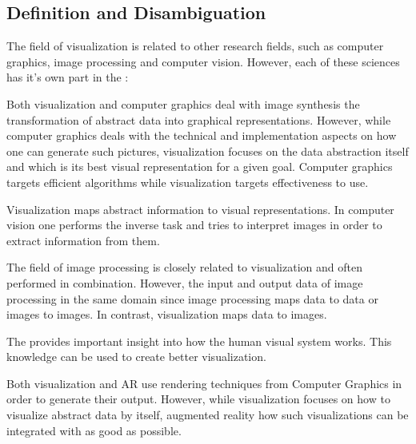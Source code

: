 \subsection{Definition and Disambiguation}
\label{sec:background:vis:definition}
The field of visualization is  related to other research fields, such as computer graphics, image processing and computer vision.
However, each of these sciences has it's own part in the  \CN:
\begin{my_list_desc}
	\item[Computer Graphics]
		Both visualization and computer graphics deal with image synthesis the transformation of abstract data into graphical representations.
		However, while computer graphics deals with the technical and implementation aspects on how one can generate such pictures, visualization focuses on the data abstraction itself and which is its best visual representation for a given goal.
		Computer graphics targets efficient algorithms while visualization targets effectiveness to use.
	
	\item[Computer Vision]
		Visualization maps abstract information to visual representations.
		In computer vision one performs the inverse task and tries to interpret images in order to extract information from them.
	
	\item[Image Processing]
		The field of image processing is closely related to visualization and often performed in combination.
		However, the input and output data of image processing  in the same domain since image processing maps data to data or images to images.
		In contrast, visualization maps data to images.
	
	\item[Perception]
		The  provides important insight into how the human visual system works.
		This knowledge can be used to create better visualization.
	
	\item[Augmented Reality] 
		Both visualization and AR use rendering techniques from Computer Graphics in order to generate their output.
		However, while visualization focuses on how to visualize abstract data by itself, augmented reality  how such visualizations can be integrated with  as good as possible.
\end{my_list_desc}

